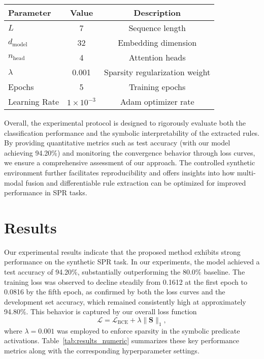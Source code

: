\documentclass{article}
\begin{document}
\begin{table}[h]
\centering
\begin{tabular}{lcc}
\hline
Parameter & Value & Description \\
\hline
\(L\) & 7 & Sequence length \\
\(d_{\text{model}}\) & 32 & Embedding dimension \\
\(n_{\text{head}}\) & 4 & Attention heads \\
\(\lambda\) & 0.001 & Sparsity regularization weight \\
Epochs & 5 & Training epochs \\
Learning Rate & \(1\times10^{-3}\) & Adam optimizer rate \\
\hline
\end{tabular}
\label{tab:hyperparams}
\end{table}

Overall, the experimental protocol is designed to rigorously evaluate both the classification performance and the symbolic interpretability of the extracted rules. By providing quantitative metrics such as test accuracy (with our model achieving 94.20\%) and monitoring the convergence behavior through loss curves, we ensure a comprehensive assessment of our approach. The controlled synthetic environment further facilitates reproducibility and offers insights into how multi-modal fusion and differentiable rule extraction can be optimized for improved performance in SPR tasks.

\section{Results}
Our experimental results indicate that the proposed method exhibits strong performance on the synthetic SPR task. In our experiments, the model achieved a test accuracy of 94.20\%, substantially outperforming the 80.0\% baseline. The training loss was observed to decline steadily from 0.1612 at the first epoch to 0.0816 by the fifth epoch, as confirmed by both the loss curves and the development set accuracy, which remained consistently high at approximately 94.80\%. This behavior is captured by our overall loss function 
\[
\mathcal{L} = \mathcal{L}_{\mathrm{BCE}} + \lambda \|\mathbf{S}\|_1,
\]
where \(\lambda=0.001\) was employed to enforce sparsity in the symbolic predicate activations. Table~\ref{tab:results_numeric} summarizes these key performance metrics along with the corresponding hyperparameter settings.
\end{document}
